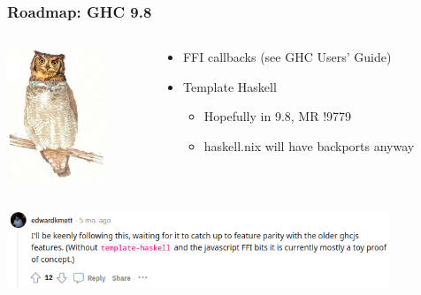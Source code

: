 \documentclass[aspectratio=169]{beamer}
\begin{document}
\begin{frame}
\frametitle{Roadmap: GHC 9.8}
\begin{columns}

\begin{column}{0.3\textwidth}
\begin{center}
\includegraphics[height=4cm]{images/owl3.png}
\end{center}
\end{column}

\begin{column}{0.6\textwidth}
\begin{itemize}
\item FFI callbacks (see GHC Users' Guide)
\item Template Haskell
\begin{itemize}
\item Hopefully in 9.8, MR !9779
\item haskell.nix will have backports anyway
\end{itemize}
\end{itemize}
\end{column}

\end{columns}
\begin{center}
\includegraphics[height=2.3cm]{images/kmett.png}
\end{center}
\end{frame}
\end{document}

